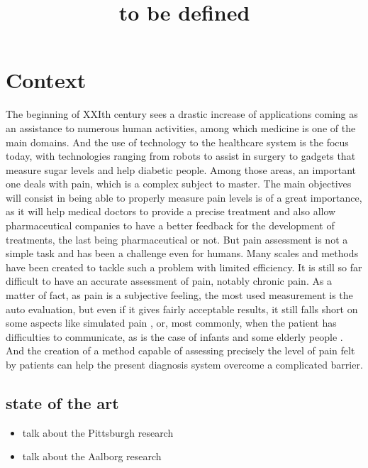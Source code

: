 \documentclass[11pt]{article}
\date{}
\title{to be defined}
\begin{document}
\maketitle

\section{Context}
\label{sec:org7b1bfe5}
 The beginning of XXIth century sees a drastic increase of applications coming as an assistance to numerous human activities,
 among which medicine is one of the main domains. And the use of technology to the healthcare system is the focus today, with
 technologies ranging from robots to assist in surgery to gadgets that measure sugar levels and help diabetic people.
 Among those areas, an important one deals with pain, which is a complex subject to master. The main objectives will consist in
 being able to properly measure pain levels is of a great importance, as it will help medical doctors to provide a precise treatment
 and also allow pharmaceutical companies to  have a better feedback for the development of treatments, the last being pharmaceutical or not.
 But pain assessment is not a simple task and has been a challenge even for humans. Many scales and methods have been created to tackle
such a problem \cite{wong1996wong,mccaffery1999pain,portenoy1996visual,melzack1975mcgill,galer1997development,gracely1988descriptor} with
limited efficiency. It is still so far difficult to  have an accurate assessment of pain, notably chronic pain.
 As a matter of fact, as pain is a subjective feeling, the most used measurement is the auto evaluation, but even if it gives fairly acceptable
results, it still falls short on some aspects like simulated pain \cite{gwen2007faces}, or, most commonly, when the patient has difficulties to
communicate, as is the case of infants and some elderly people \cite{lucey2011automatically}.
 And the creation of a method capable of assessing precisely the level of pain felt by patients can help the present diagnosis system overcome
a complicated barrier.


\subsection{state of the art}
\label{sec:org27f4b13}

\begin{itemize}
\item talk about the Pittsburgh research
\item talk about the Aalborg research
\end{itemize}
\end{document}
